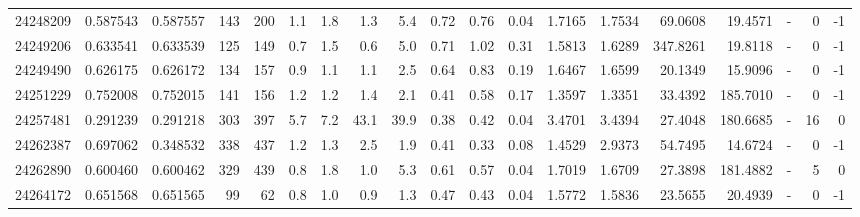 \begin{tabular}{rrrrrrrrrrrrrrrrlrr}
  24248209 & 0.587543 &   0.587557 &  143 &  200 &      1.1 &      1.8 &     1.3 &      5.4 &       0.72 &        0.76 &        0.04 &  1.7165 &  1.7534 &   69.0608 &   19.4571 &             - &        0 &         -1 \\
  24249206 & 0.633541 &   0.633539 &  125 &  149 &      0.7 &      1.5 &     0.6 &      5.0 &       0.71 &        1.02 &        0.31 &  1.5813 &  1.6289 &  347.8261 &   19.8118 &             - &        0 &         -1 \\
  24249490 & 0.626175 &   0.626172 &  134 &  157 &      0.9 &      1.1 &     1.1 &      2.5 &       0.64 &        0.83 &        0.19 &  1.6467 &  1.6599 &   20.1349 &   15.9096 &             - &        0 &         -1 \\
  24251229 & 0.752008 &   0.752015 &  141 &  156 &      1.2 &      1.2 &     1.4 &      2.1 &       0.41 &        0.58 &        0.17 &  1.3597 &  1.3351 &   33.4392 &  185.7010 &             - &        0 &         -1 \\
  24257481 & 0.291239 &   0.291218 &  303 &  397 &      5.7 &      7.2 &    43.1 &     39.9 &       0.38 &        0.42 &        0.04 &  3.4701 &  3.4394 &   27.4048 &  180.6685 &             - &       16 &          0 \\
  24262387 & 0.697062 &   0.348532 &  338 &  437 &      1.2 &      1.3 &     2.5 &      1.9 &       0.41 &        0.33 &        0.08 &  1.4529 &  2.9373 &   54.7495 &   14.6724 &             - &        0 &         -1 \\
  24262890 & 0.600460 &   0.600462 &  329 &  439 &      0.8 &      1.8 &     1.0 &      5.3 &       0.61 &        0.57 &        0.04 &  1.7019 &  1.6709 &   27.3898 &  181.4882 &             - &        5 &          0 \\
  24264172 & 0.651568 &   0.651565 &   99 &   62 &      0.8 &      1.0 &     0.9 &      1.3 &       0.47 &        0.43 &        0.04 &  1.5772 &  1.5836 &   23.5655 &   20.4939 &             - &        0 &         -1 \\
\bottomrule
\end{tabular}
